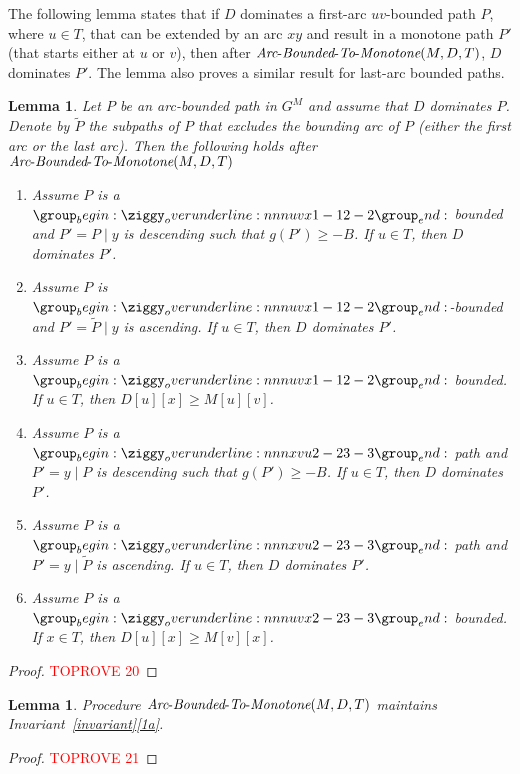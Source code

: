 \documentclass[11pt]{article}
\newtheorem{lemma}[theorem]{Lemma}
\newcommand{\Extend}{\mbox{{\it Arc}-{\it Bounded}-{\it To}-{\it Monotone}}}
\begin{document}
The following lemma states that if $D$ dominates a first-arc $uv$-bounded path $P$, where $u\in T$, that can be extended by an arc $xy$ and result in a monotone path $P'$ (that starts either at $u$ or $v$), then after $\Extend(M,D,T)$, $D$ dominates $P'$. The lemma also proves a similar result for last-arc bounded paths.





\begin{lemma}\label{lemma:long-shortcuts-dominating}
   Let $P$ be an arc-bounded path in $G^M$ and assume that $D$ dominates $P$. Denote by $\tilde{P}$ the subpaths of $P$ that excludes the bounding arc of $P$ (either the first arc or the last arc). Then the following holds after $\Extend(M,D,T)$
    \begin{enumerate}
        \item Assume $P$ is a $\overunderline{uvx}{1-1}{2-2}$ bounded and $P' = P\mid y $ is descending such that $g(P')\ge -B$. If $u \in T$, then $D$ dominates $P'$.
        \item Assume $P$ is $\overunderline{uvx}{1-1}{2-2}$-bounded and $P' = \tilde{P}\mid y $ is ascending. If $u \in T$, then $D$ dominates $P'$.
        \item  Assume $P$ is a $\overunderline{uvx}{1-1}{2-2}$ bounded. If $u \in T$, then $D[u][x]\ge M[u][v]$.
        \item Assume $P$ is a $\overunderline{xvu}{2-2}{3-3}$ path and $P' = y \mid P $ is descending such that $g(P')\ge -B$. If $u \in T$, then $D$ dominates $P'$.
        \item Assume $P$ is a $\overunderline{xvu}{2-2}{3-3}$ path and $P' = y \mid \tilde{P} $ is ascending. If $u \in T$, then $D$ dominates $P'$.
        \item Assume $P$ is a $\overunderline{uvx}{2-2}{3-3}$ bounded. If $x \in T$, then $D[u][x]\ge M[v][x]$.
    \end{enumerate}
\end{lemma}

\begin{proof}\textcolor{red}{TOPROVE 20}\end{proof}

\begin{lemma}\label{lemms:long-shortcuts-invariant}
    Procedure $\Extend(M,D,T)$ maintains Invariant~\ref{invariant}\ref{1a}.
\end{lemma}

\begin{proof}\textcolor{red}{TOPROVE 21}\end{proof}
\end{document}
